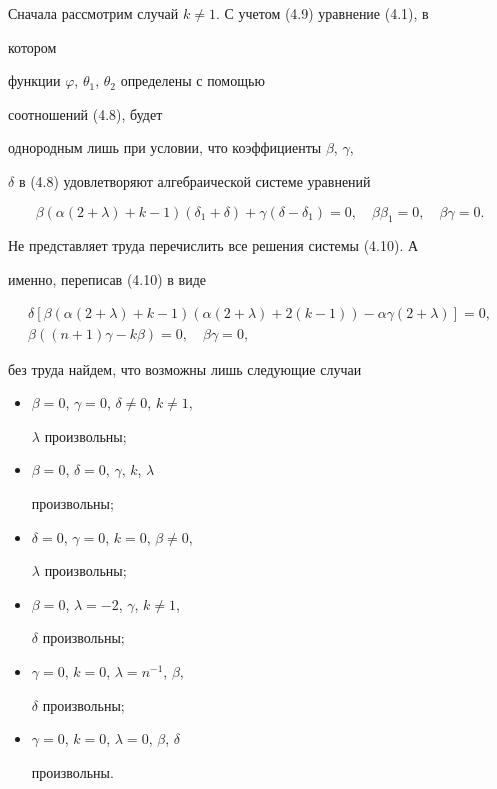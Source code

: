 Сначала рассмотрим случай $k\ne 1$. С учетом (4.9) уравнение (4.1), в


котором


функции $\varphi$, $\theta_1$, $\theta_2$ определены с помощью


соотношений (4.8), будет


однородным лишь при условии, что коэффициенты $\beta$, $\gamma$,


$\delta$ в (4.8) удовлетворяют алгебраической системе уравнений


\begin{equation}


\beta(\alpha(2+\lambda)+k-1)(\delta_1+\delta)+


\gamma(\delta-\delta_1)=0,\quad \beta\beta_1=0,\quad


\beta\gamma=0.\tag{4.10}


\end{equation}


Не представляет труда перечислить все решения системы (4.10). А


именно, переписав (4.10) в виде


\begin{gather*}


\delta[\beta(\alpha(2+\lambda)+k-1)(\alpha(2+\lambda)+


2(k-1))-\alpha\gamma(2+\lambda)]=0,\\


\beta((n+1)\gamma-k\beta)=0,\quad \beta\gamma=0,


\end{gather*}


без труда найдем, что возможны лишь следующие случаи


\begin{itemize}


\item[1)] $\beta=0$, $\gamma=0$, $\delta\ne 0$, $k\ne 1$,


$\lambda$ произвольны;


\item[2)] $\beta=0$, $\delta=0$, $\gamma$, $k$, $\lambda$


произвольны;


\item[3)] $\delta=0$, $\gamma=0$, $k=0$, $\beta\ne 0$,


$\lambda$ произвольны;


\item[4)] $\beta=0$, $\lambda=-2$, $\gamma$, $k\ne 1$,


$\delta$ произвольны;


\item[5)] $\gamma=0$, $k=0$, $\lambda=n^{-1}$, $\beta$,


$\delta$ произвольны;


\item[6)] $\gamma=0$, $k=0$, $\lambda=0$, $\beta$, $\delta$


произвольны.


\end{itemize}


